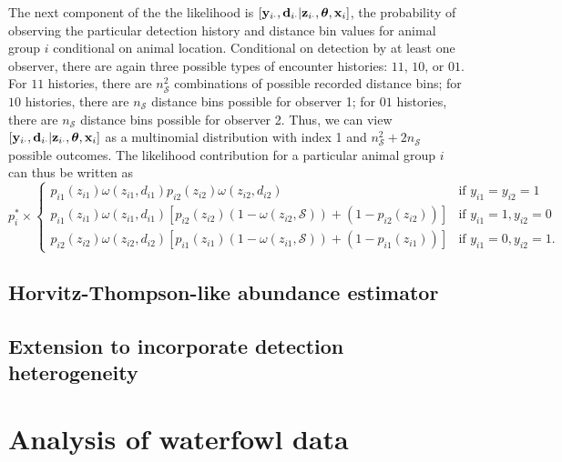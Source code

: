\documentclass[12pt,fleqn]{article}
\begin{document}
The next component of the the likelihood is $[{\bf y}_{i \cdot},{\bf d}_{i \cdot}|{\bf z}_{i \cdot} , \boldsymbol{\theta} , {\bf x}_i]$, the probability of observing the particular detection history and distance bin values for animal group $i$ conditional on animal location.  Conditional on detection by at least one observer, there are again three possible types of encounter histories: $11$, $10$, or $01$.  For $11$ histories, there are $n_\mathcal{S}^2$ combinations of possible recorded distance bins; for $10$ histories, there are $n_\mathcal{S}$ distance bins possible for observer 1; for $01$ histories, there are $n_\mathcal{S}$ distance bins possible for observer 2.  Thus, we can view $[{\bf y}_{i \cdot},{\bf d}_{i \cdot}|{\bf z}_{i \cdot} , \boldsymbol{\theta} , {\bf x}_i]$ as a multinomial distribution with index 1 and $n_\mathcal{S}^2 + 2 n_\mathcal{S}$ possible outcomes. The likelihood contribution for a particular animal group $i$ can thus be written as
\begin{equation*}
    p_i^* \times  \left\{ \begin{array}{rl}
    p_{i1}(z_{i1}) \omega(z_{i1},d_{i1}) p_{i2}(z_{i2}) \omega(z_{i2},d_{i2}) & \text{if }y_{i1}=y_{i2}=1 \\
    p_{i1}(z_{i1})\omega(z_{i1},d_{i1}) \left[
    p_{i2}(z_{i2})(1-\omega(z_{i2},\mathcal{S}))+(1-p_{i2}(z_{i2})) \right] &  \text{if } y_{i1}=1, y_{i2}=0 \\
    p_{i2}(z_{i2})\omega(z_{i2},d_{i2}) \left[
    p_{i1}(z_{i1})(1-\omega(z_{i1},\mathcal{S}))+(1-p_{i1}(z_{i1})) \right]
                                     &  \text{if } y_{i1}=0, y_{i2}=1.
                                    \end{array} \right.
\end{equation*}





\subsection{Horvitz-Thompson-like abundance estimator}

\subsection{Extension to incorporate detection heterogeneity}


\section{Analysis of waterfowl data}
\end{document}
